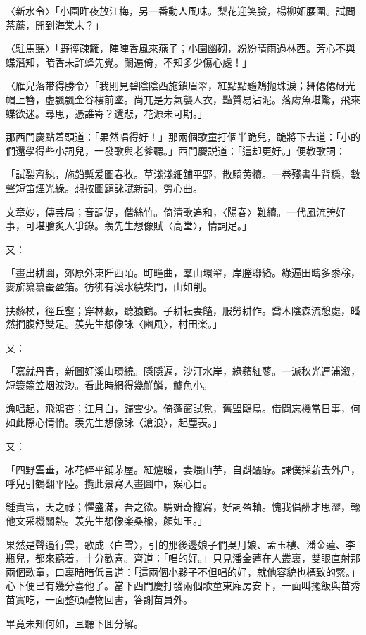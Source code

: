 \begin{myquote}
{\markfont〈新水令〉}「小園昨夜放江梅，另一番動人風味。梨花迎笑臉，楊柳妬腰圍。試問荼䕷，開到海棠未？」

{\markfont〈駐馬聽〉}「野徑疎籬，陣陣香風來燕子；小園幽砌，紛紛晴雨過林西。芳心不與蝶潛知，暗香未許蜂先覺。闌遍倚，不知多少傷心處！」

{\markfont〈雁兒落带得勝令〉}「我則見碧陰陰西施鎖眉翠，紅點點鶗鴂抛珠淚；舞僊僊砑光帽上簪，虚飄飄金谷樓前墜。尚兀是芳氣襲人衣，豔質易沾泥。落䖏魚堪驚，飛來蝶欲迷。尋思，憑誰寄？還悲，花源未可期。」
\end{myquote}

那西門慶點着頭道：「果然唱得好！」那兩個歌童打個半跪兒，跪將下去道：「小的們還學得些小詞兒，一發歌與老爹聽。」西門慶説道：「這却更好。」便教歌詞：

\begin{myquote}
「試裂齊紈，施鉛槧爰圖春牧。草淺淺細舖平野，散騎黄犢。一卷殘書牛背穩，數聲短笛煙光綠。想按圖題詠賦新詞，勞心曲。

文章妙，傳芸局；音調促，偕絲竹。倚清歌追和，〈陽春〉難續。一代風流誇好事，可堪膾炙人爭錄。羡先生想像賦〈高堂〉，情詞足。」
\end{myquote}

又：

\begin{myquote}
「畫出耕圖，郊原外東阡西陌。町疃曲，羣山環翠，岸塍聯絡。綠遍田疇多黍稌，麥旂纂纂蚕盈箔。彷彿有溪水繞柴門，山如削。

扶藜杖，徑丘壑；穿林藪，聽猿鶴。子耕耘妻饁，服勞耕作。喬木陰森流憩處，皤然捫腹舒雙足。羨先生想像詠〈豳風〉，村田楽。」
\end{myquote}

又：

\begin{myquote}
「寫就丹青，新圖好溪山環繞。隱隱遍，沙汀水岸，綠蘋紅蓼。一派秋光連浦溆，短簑篛笠烟波渺。看此時網得幾鮮鱗，鱸魚小。

漁唱起，飛鴻杳；江月白，歸雲少。倚蓬窗試覓，舊盟鷗鳥。借問忘機當日事，何如此際心情悄。羡先生想像詠〈滄浪〉，起塵表。」
\end{myquote}

又：

\begin{myquote}
「四野雲垂，冰花碎平舖茅屋。紅爐暖，妻煨山芋，自斟醽醁。課僕採薪去外户，呼兒引鶴翻平陸。攬此景寫入畫圖中，娱心目。

鍾貴富，天之祿；懼盛滿，吾之欲。騁姸奇攄寫，好詞盈軸。愧我倡酬才思澀，輸他文采機關熱。羡先生想像楽桑楡，顏如玉。」
\end{myquote}

果然是聲遏行雲，歌成〈白雪〉，引的那後邊娘子們吳月娘、孟玉樓、潘金蓮、李瓶兒，都來聽着，十分歡喜。齊道：「唱的好。」只見潘金蓮在人叢裏，雙眼直射那兩個歌童，口裏暗暗低言道：「這兩個小夥子不但唱的好，就他容貌也標致的緊。」心下便已有幾分喜他了。當下西門慶打發兩個歌童東廂房安下，一面叫擺飯與苗秀苗實吃，一面整頓禮物回書，答謝苗員外。

畢竟未知何如，且聽下囬分解。

